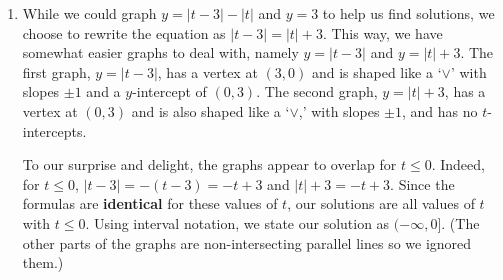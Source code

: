 \documentclass{ximera}
\begin{document}
\begin{example}
\begin{enumerate}
\begin{center}
\end{center}

The question is if there are any other solutions.  Our graph certainly looks as if there is just one intersection point, but we know from Theorem \ref{linearabsvaluegraphs} that the slopes of the linear parts of $y = 4 - |x|$ are $\pm 1$.  The slope of $y =  0.9x - 3.6$ is $0.9$ and $0.9 \neq 1$ so we know that the left hand side of the`$\wedge$' must meet up with the graph of the line because they are not parallel.\footnote{See Theorem \ref{parallelperpendicularslopetheorem}.}

\medskip

Definition \ref{absolutevaluepiecewise} tells us that when $x<0$, $|x| = -x$, so $4-|x| = 4-(-x) = 4+x$.  Hence we set about solving  $4+x = 0.9x - 3.6$ and get $x = -76$. Both $x = -76$ and $x = 4$  check in our original equation, $4-|x| = 0.9x  - 3.6$, so we have found our two solutions. Returning to the graph above, we invite the reader to adjust the "zoom" slider to see the other intersection point, $(-76, -72)$ which corresponds to our second solution.\footnote{Once again, we see that the technology \textit{suggests} solutions whereas the algebra \textit{proves} them.}



\item  While we could graph  $y = |t-3| - |t|$ and $y = 3$ to help us find solutions, we choose to rewrite the equation as $|t-3|  = |t| +  3$.  This way, we have somewhat easier graphs to deal with, namely $y = |t-3|$ and $y = |t|+3$.  The first graph, $y = |t-3|$, has a vertex at $(3,0)$  and is shaped  like a   `$\vee$' with slopes $\pm 1$ and a  $y$-intercept of $(0, 3)$.  The second graph, $y = |t|+3$, has a vertex at $(0,3)$ and is also shaped like a  `$\vee$,' with slopes $\pm 1$, and has no $t$-intercepts.  

\begin{center}
\end{center}

To our surprise and delight, the graphs appear to overlap for $t \leq 0$.  Indeed, for $t \leq 0$, $|t-3| = -(t-3) = -t+3$ and $|t| + 3 = - t+3$.  Since the formulas are \textbf{identical} for these values of $t$, our solutions are all values of $t$ with $t \leq 0$.  Using interval notation, we state our solution as $(-\infty, 0]$. (The other parts of the graphs are non-intersecting parallel lines so we ignored them.)


\end{enumerate}
\end{example}
\end{document}
